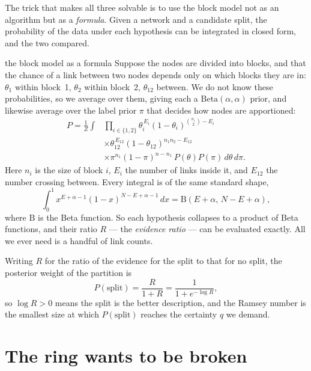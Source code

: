 The trick that makes all three solvable is to use the block model not as an
algorithm but as a \emph{formula}. Given a network and a candidate split, the
probability of the data under each hypothesis can be integrated in closed form,
and the two compared.

\begin{calculation}{the block model as a formula}
Suppose the nodes are divided into blocks, and that the chance of a link between
two nodes depends only on which blocks they are in: $\theta_1$ within block~1,
$\theta_2$ within block~2, $\theta_{12}$ between. We do not know these
probabilities, so we average over them, giving each a $\mathrm{Beta}(\alpha,\alpha)$
prior, and likewise average over the label prior $\pi$ that decides how nodes are
apportioned:
\begin{equation}
\begin{split}
  P = \frac{1}{Z}\int
  &\prod_{i\in\{1,2\}}\theta_i^{\,E_i}(1-\theta_i)^{\binom{n_i}{2}-E_i}\\
  &\times\theta_{12}^{\,E_{12}}(1-\theta_{12})^{n_1n_2-E_{12}}\\
  &\times\pi^{n_1}(1-\pi)^{n-n_1}\,P(\theta)P(\pi)\,d\theta\,d\pi .
\end{split}
\label{eq:com-model}
\end{equation}
Here $n_i$ is the size of block $i$, $E_i$ the number of links inside it, and
$E_{12}$ the number crossing between. Every integral is of the same standard shape,
\begin{equation}
  \int_0^1 x^{E+\alpha-1}(1-x)^{N-E+\alpha-1}\,dx
  = \mathrm{B}(E{+}\alpha,\,N{-}E{+}\alpha),
  \label{eq:com-betaint}
\end{equation}
where $\mathrm{B}$ is the Beta function. So each hypothesis collapses to a product
of Beta functions, and their ratio $R$ --- the \emph{evidence ratio} --- can be
evaluated exactly. All we ever need is a handful of link counts.
\end{calculation}

Writing $R$ for the ratio of the evidence for the split to that for no split, the
posterior weight of the partition is
\begin{equation}
  P(\mathrm{split}) = \frac{R}{1+R} = \frac{1}{1+e^{-\log R}},
  \label{eq:com-psplit}
\end{equation}
so $\log R>0$ means the split is the better description, and the Ramsey number is
the smallest size at which $P(\mathrm{split})$ reaches the certainty $q$ we demand.

\section{The ring wants to be broken}

